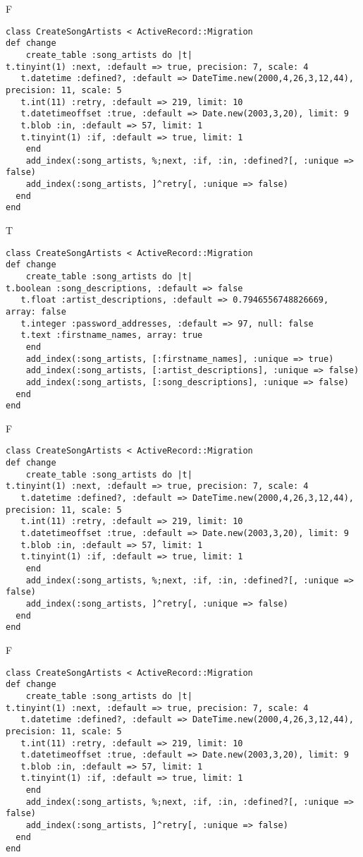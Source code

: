 F
\begin{verbatim}
class CreateSongArtists < ActiveRecord::Migration
def change
	create_table :song_artists do |t|
t.tinyint(1) :next, :default => true, precision: 7, scale: 4
   t.datetime :defined?, :default => DateTime.new(2000,4,26,3,12,44), precision: 11, scale: 5
   t.int(11) :retry, :default => 219, limit: 10
   t.datetimeoffset :true, :default => Date.new(2003,3,20), limit: 9
   t.blob :in, :default => 57, limit: 1
   t.tinyint(1) :if, :default => true, limit: 1
   	end
	add_index(:song_artists, %;next, :if, :in, :defined?[, :unique => false)
	add_index(:song_artists, ]^retry[, :unique => false)
  end 
end

\end{verbatim}

T
\begin{verbatim}
class CreateSongArtists < ActiveRecord::Migration
def change
	create_table :song_artists do |t|
t.boolean :song_descriptions, :default => false
   t.float :artist_descriptions, :default => 0.7946556748826669, array: false
   t.integer :password_addresses, :default => 97, null: false
   t.text :firstname_names, array: true
   	end
	add_index(:song_artists, [:firstname_names], :unique => true)
	add_index(:song_artists, [:artist_descriptions], :unique => false)
	add_index(:song_artists, [:song_descriptions], :unique => false)
  end 
end

\end{verbatim}

F
\begin{verbatim}
class CreateSongArtists < ActiveRecord::Migration
def change
	create_table :song_artists do |t|
t.tinyint(1) :next, :default => true, precision: 7, scale: 4
   t.datetime :defined?, :default => DateTime.new(2000,4,26,3,12,44), precision: 11, scale: 5
   t.int(11) :retry, :default => 219, limit: 10
   t.datetimeoffset :true, :default => Date.new(2003,3,20), limit: 9
   t.blob :in, :default => 57, limit: 1
   t.tinyint(1) :if, :default => true, limit: 1
   	end
	add_index(:song_artists, %;next, :if, :in, :defined?[, :unique => false)
	add_index(:song_artists, ]^retry[, :unique => false)
  end 
end

\end{verbatim}

F
\begin{verbatim}
class CreateSongArtists < ActiveRecord::Migration
def change
	create_table :song_artists do |t|
t.tinyint(1) :next, :default => true, precision: 7, scale: 4
   t.datetime :defined?, :default => DateTime.new(2000,4,26,3,12,44), precision: 11, scale: 5
   t.int(11) :retry, :default => 219, limit: 10
   t.datetimeoffset :true, :default => Date.new(2003,3,20), limit: 9
   t.blob :in, :default => 57, limit: 1
   t.tinyint(1) :if, :default => true, limit: 1
   	end
	add_index(:song_artists, %;next, :if, :in, :defined?[, :unique => false)
	add_index(:song_artists, ]^retry[, :unique => false)
  end 
end

\end{verbatim}

